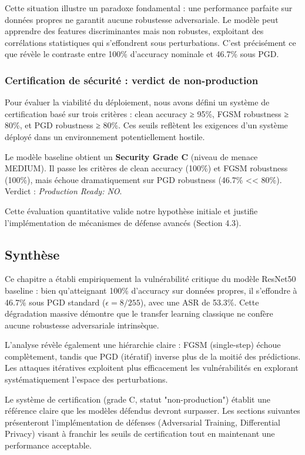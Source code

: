 Cette situation illustre un paradoxe fondamental : une performance parfaite sur données propres ne garantit aucune robustesse adversariale. Le modèle peut apprendre des features discriminantes mais non robustes, exploitant des corrélations statistiques qui s'effondrent sous perturbations. C'est précisément ce que révèle le contraste entre 100\% d'accuracy nominale et 46.7\% sous PGD.

\subsubsection{Certification de sécurité : verdict de non-production}

Pour évaluer la viabilité du déploiement, nous avons défini un système de certification basé sur trois critères : clean accuracy ≥ 95\%, FGSM robustness ≥ 80\%, et PGD robustness ≥ 80\%. Ces seuils reflètent les exigences d'un système déployé dans un environnement potentiellement hostile.

Le modèle baseline obtient un \textbf{Security Grade C} (niveau de menace MEDIUM). Il passe les critères de clean accuracy (100\%) et FGSM robustness (100\%), mais échoue dramatiquement sur PGD robustness (46.7\% << 80\%). Verdict : \textit{Production Ready: NO}.

Cette évaluation quantitative valide notre hypothèse initiale et justifie l'implémentation de mécanismes de défense avancés (Section 4.3).

\subsection*{Synthèse}

Ce chapitre a établi empiriquement la vulnérabilité critique du modèle ResNet50 baseline : bien qu'atteignant 100\% d'accuracy sur données propres, il s'effondre à 46.7\% sous PGD standard ($\epsilon=8/255$), avec une ASR de 53.3\%. Cette dégradation massive démontre que le transfer learning classique ne confère aucune robustesse adversariale intrinsèque.

L'analyse révèle également une hiérarchie claire : FGSM (single-step) échoue complètement, tandis que PGD (itératif) inverse plus de la moitié des prédictions. Les attaques itératives exploitent plus efficacement les vulnérabilités en explorant systématiquement l'espace des perturbations.

Le système de certification (grade C, statut "non-production") établit une référence claire que les modèles défendus devront surpasser. Les sections suivantes présenteront l'implémentation de défenses (Adversarial Training, Differential Privacy) visant à franchir les seuils de certification tout en maintenant une performance acceptable.

